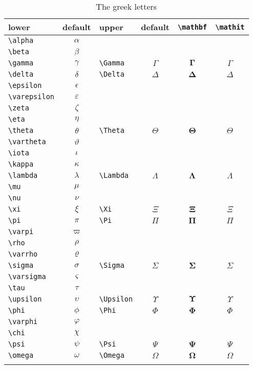 \begin{table}[htb]
\bgroup
\tabcolsep=3pt
\begin{longtable}{lclccc}
lower & default &  upper & default & \verb|\mathbf| & \verb|\mathit|\\\hline
\endhead
\verb|\alpha| & $\alpha$ \\
\verb|\beta|  & $\beta$  \\
\verb|\gamma| & $\gamma$
	& \verb|\Gamma| & $\Gamma$ & $\mathbf{\Gamma}$ & $\mathit{\Gamma}$\\
\verb|\delta| & $\delta$
	& \verb|\Delta| & $\Delta$ & $\mathbf{\Delta}$ & $\mathit{\Delta}$\\
\verb|\epsilon|  & $\epsilon$\\
\verb|\varepsilon|  & $\varepsilon$\\
\verb|\zeta|  & $\zeta$\\
\verb|\eta|  & $\eta$ \\
\verb|\theta|  & $\theta$
	& \verb|\Theta| & $\Theta$ & $\mathbf{\Theta}$ & $\mathit{\Theta}$\\
\verb|\vartheta|  & $\vartheta$\\
\verb|\iota|  & $\iota$\\
\verb|\kappa|  & $\kappa$\\
\verb|\lambda| & $\lambda$
	& \verb|\Lambda| & $\Lambda$ & $\mathbf{\Lambda}$ & $\mathit{\Lambda}$\\
\verb|\mu|  & $\mu$ \\
\verb|\nu|  & $\nu$\\
\verb|\xi|  & $\xi$
	& \verb|\Xi| & $\Xi$ & $\mathbf{\Xi}$ & $\mathit{\Xi}$\\
\verb|\pi|  & $\pi$
	& \verb|\Pi| & $\Pi$ & $\mathbf{\Pi}$ & $\mathit{\Pi}$\\
\verb|\varpi|  & $\varpi$ \\
\verb|\rho|  & $\rho$\\
\verb|\varrho|  & $\varrho$\\
\verb|\sigma| & $\sigma$
	& \verb|\Sigma| & $\Sigma$ & $\mathbf{\Sigma}$ & $\mathit{\Sigma}$\\
\verb|\varsigma| & $\varsigma$\\
\verb|\tau|  & $\tau$\\
\verb|\upsilon|  & $\upsilon$
	& \verb|\Upsilon| & $\Upsilon$ & $\mathbf{\Upsilon}$ & $\mathit{\Upsilon}$\\
\verb|\phi|  & $\phi$
	& \verb|\Phi| & $\Phi$ & $\mathbf{\Phi}$ & $\mathit{\Phi}$\\
\verb|\varphi|  & $\varphi$\\
\verb|\chi|  & $\chi$ \\
\verb|\psi|  & $\psi$
	& \verb|\Psi| & $\Psi$ & $\mathbf{\Psi}$ & $\mathit{\Psi}$\\
\verb|\omega| & $\omega$
	& \verb|\Omega| & $\Omega$ & $\mathbf{\Omega}$ & $\mathit{\Omega}$\\[5pt]
\caption{The greek letters}\label{tab:greek-letters}\\
\end{longtable}
\egroup


\end{table}
